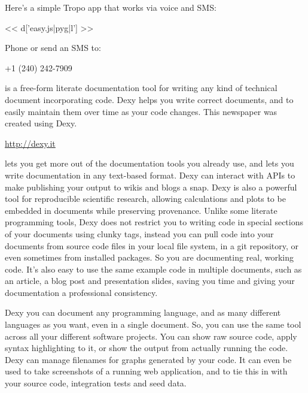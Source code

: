 \documentclass[custom, plainsections]{sciposter}
\begin{document}
\begin{multicols*}{3}
Here's a simple Tropo app that works via voice and SMS:

<< d['easy.js|pyg|l'] >>

Phone or send an SMS to:

\Large
\begin{center}
+1 (240) 242-7909
\end{center}
\small

\vspace{1cm}

 is a free-form literate documentation tool for writing any kind of technical document incorporating code. Dexy helps you write correct documents, and to easily maintain them over time as your code changes. This newspaper was created using Dexy.

\large
\begin{center}
\href{http://bit.ly/xCJXxJ}{http://dexy.it}
\end{center}
\small

 lets you get more out of the documentation tools you already use, and lets you write documentation in any text-based format. Dexy can interact with APIs to make publishing your output to wikis and blogs a snap. Dexy is also a powerful tool for reproducible scientific research, allowing calculations and plots to be embedded in documents while preserving provenance. Unlike some literate programming tools, Dexy does not restrict you to writing code in special sections of your documents using clunky tags, instead you can pull code into your documents from source code files in your local file system, in a git repository, or even sometimes from installed packages. So you are documenting real, working code. It's also easy to use the same example code in multiple documents, such as an article, a blog post and presentation slides, saving you time and giving your documentation a professional consistency.

 Dexy you can document any programming language, and as many different languages as you want, even in a single document. So, you can use the same tool across all your different software projects. You can show raw source code, apply syntax highlighting to it, or show the output from actually running the code. Dexy can manage filenames for graphs generated by your code. It can even be used to take screenshots of a running web application, and to tie this in with your source code, integration tests and seed data.


\end{multicols*}
\end{document}
